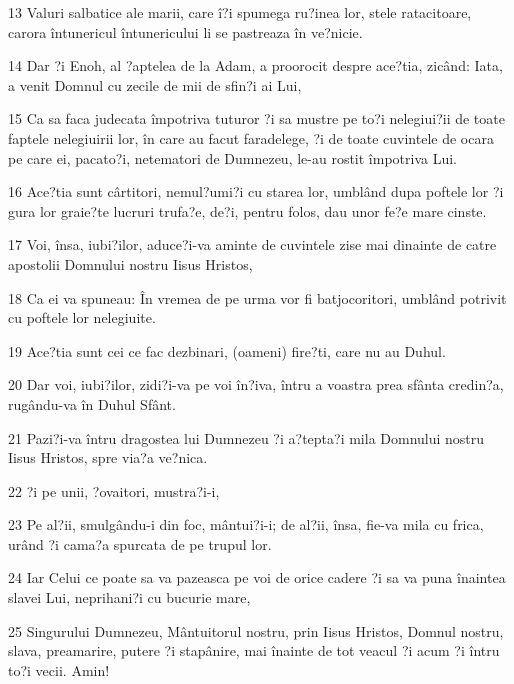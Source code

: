 \par 13 Valuri salbatice ale marii, care î?i spumega ru?inea lor, stele ratacitoare, carora întunericul întunericului li se pastreaza în ve?nicie.
\par 14 Dar ?i Enoh, al ?aptelea de la Adam, a proorocit despre ace?tia, zicând: Iata, a venit Domnul cu zecile de mii de sfin?i ai Lui,
\par 15 Ca sa faca judecata împotriva tuturor ?i sa mustre pe to?i nelegiui?ii de toate faptele nelegiuirii lor, în care au facut faradelege, ?i de toate cuvintele de ocara pe care ei, pacato?i, netematori de Dumnezeu, le-au rostit împotriva Lui.
\par 16 Ace?tia sunt cârtitori, nemul?umi?i cu starea lor, umblând dupa poftele lor ?i gura lor graie?te lucruri trufa?e, de?i, pentru folos, dau unor fe?e mare cinste.
\par 17 Voi, însa, iubi?ilor, aduce?i-va aminte de cuvintele zise mai dinainte de catre apostolii Domnului nostru Iisus Hristos,
\par 18 Ca ei va spuneau: În vremea de pe urma vor fi batjocoritori, umblând potrivit cu poftele lor nelegiuite.
\par 19 Ace?tia sunt cei ce fac dezbinari, (oameni) fire?ti, care nu au Duhul.
\par 20 Dar voi, iubi?ilor, zidi?i-va pe voi în?iva, întru a voastra prea sfânta credin?a, rugându-va în Duhul Sfânt.
\par 21 Pazi?i-va întru dragostea lui Dumnezeu ?i a?tepta?i mila Domnului nostru Iisus Hristos, spre via?a ve?nica.
\par 22 ?i pe unii, ?ovaitori, mustra?i-i,
\par 23 Pe al?ii, smulgându-i din foc, mântui?i-i; de al?ii, însa, fie-va mila cu frica, urând ?i cama?a spurcata de pe trupul lor.
\par 24 Iar Celui ce poate sa va pazeasca pe voi de orice cadere ?i sa va puna înaintea slavei Lui, neprihani?i cu bucurie mare,
\par 25 Singurului Dumnezeu, Mântuitorul nostru, prin Iisus Hristos, Domnul nostru, slava, preamarire, putere ?i stapânire, mai înainte de tot veacul ?i acum ?i întru to?i vecii. Amin!


